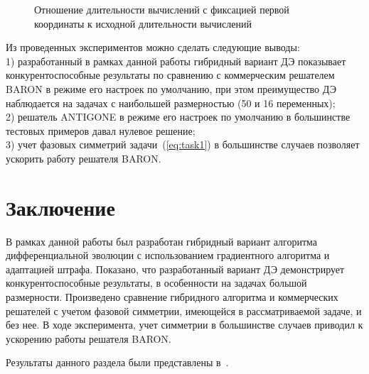 \begin{figure}
\caption{Отношение длительности вычислений с фиксацией первой координаты к исходной длительности вычислений}
\label{ris:ring}
\end{figure}

Из проведенных экспериментов можно сделать следующие выводы:\\
1) разработанный в рамках данной работы гибридный вариант ДЭ показывает конкурентоспособные результаты по сравнению с коммерческим решателем BARON в режиме его настроек по умолчанию, при этом преимущество ДЭ наблюдается на задачах с наибольшей размерностью (50 и 16 переменных);\\
2) решатель ANTIGONE в режиме его настроек по умолчанию в большинстве тестовых примеров давал нулевое решение;\\
3) учет фазовых симметрий задачи~(\ref{eq:task1}) в большинстве случаев позволяет ускорить работу решателя BARON.\\

\section{Заключение}\label{sec:conclusion}

В рамках данной работы был разработан гибридный вариант алгоритма дифференциальной эволюции с использованием
градиентного алгоритма и адаптацией штрафа. Показано, что разработанный вариант ДЭ демонстрирует конкурентоспособные результаты, в
особенности на задачах большой размерности. Произведено сравнение гибридного алгоритма и коммерческих решателей с
учетом фазовой симметрии, имеющейся в рассматриваемой задаче, и без нее. В ходе эксперимента, учет симметрии в большинстве
случаев приводил к ускорению работы решателя BARON.

Результаты данного раздела были представлены в~\cite{tyu:msim22,tyu:reis}.
